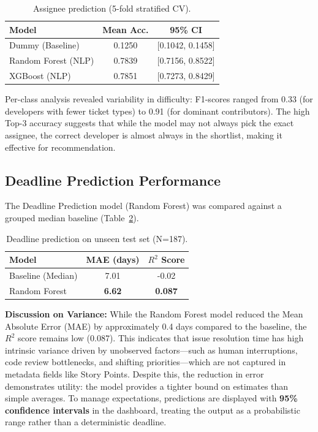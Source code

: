 \documentclass[conference]{IEEEtran}
\begin{document}
\begin{table}[t]
\centering
\caption{Assignee prediction (5-fold stratified CV).}
\renewcommand{\arraystretch}{1.08}
\begin{tabular}{l c c}
\hline
\textbf{Model} & \textbf{Mean Acc.} & \textbf{95\% CI} \\
\hline
Dummy (Baseline) & 0.1250 & [0.1042, 0.1458] \\
Random Forest (NLP) & 0.7839 & [0.7156, 0.8522] \\
XGBoost (NLP) & 0.7851 & [0.7273, 0.8429] \\
\hline
\end{tabular}
\label{tab:assignee_cv}
\end{table}

Per-class analysis revealed variability in difficulty: F1-scores ranged from 0.33 (for developers with fewer ticket types) to 0.91 (for dominant contributors). The high Top-3 accuracy suggests that while the model may not always pick the exact assignee, the correct developer is almost always in the shortlist, making it effective for recommendation.

\subsection{Deadline Prediction Performance}

The Deadline Prediction model (Random Forest) was compared against a grouped median baseline (Table~\ref{tab:deadline_baseline}).

\begin{table}[t]
\centering
\caption{Deadline prediction on unseen test set (N=187).}
\renewcommand{\arraystretch}{1.08}
\begin{tabular}{l c c}
\hline
\textbf{Model} & \textbf{MAE (days)} & \textbf{$R^2$ Score} \\
\hline
Baseline (Median) & 7.01 & -0.02 \\
Random Forest & \textbf{6.62} & \textbf{0.087} \\
\hline
\end{tabular}
\label{tab:deadline_baseline}
\end{table}

\textbf{Discussion on Variance:} While the Random Forest model reduced the Mean Absolute Error (MAE) by approximately 0.4 days compared to the baseline, the $R^2$ score remains low (0.087). This indicates that issue resolution time has high intrinsic variance driven by unobserved factors—such as human interruptions, code review bottlenecks, and shifting priorities—which are not captured in metadata fields like Story Points. Despite this, the reduction in error demonstrates utility: the model provides a tighter bound on estimates than simple averages. To manage expectations, predictions are displayed with \textbf{95\% confidence intervals} in the dashboard, treating the output as a probabilistic range rather than a deterministic deadline.
\end{document}
